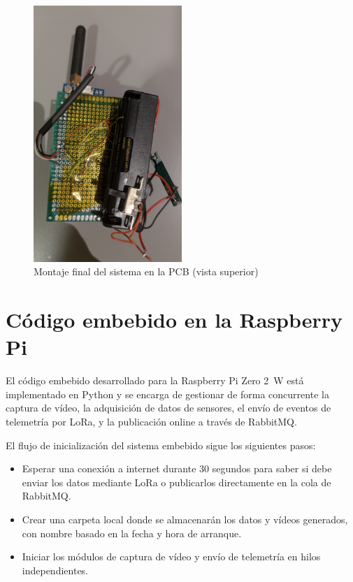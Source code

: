 \begin{figure}[H]
    \centering
    \includegraphics[width=0.5\textwidth]{Imagenes/Bitmap/pcb_montaje_trasero}
    \caption{Montaje final del sistema en la PCB (vista superior)}
    \label{fig:montaje_trasero}
\end{figure}


\section{Código embebido en la Raspberry Pi}

El código embebido desarrollado para la Raspberry Pi Zero 2~W está implementado en Python y se encarga de gestionar de forma concurrente la captura de vídeo, la adquisición de datos de sensores, el envío de eventos de telemetría por LoRa, y la publicación online a través de RabbitMQ.

El flujo de inicialización del sistema embebido sigue los siguientes pasos:

\begin{itemize}
    \item Esperar una conexión a internet durante 30 segundos para saber si debe enviar los datos mediante LoRa o publicarlos directamente en la cola de RabbitMQ.
    \item Crear una carpeta local donde se almacenarán los datos y vídeos generados, con nombre basado en la fecha y hora de arranque.
    \item Iniciar los módulos de captura de vídeo y envío de telemetría en hilos independientes.
\end{itemize}

